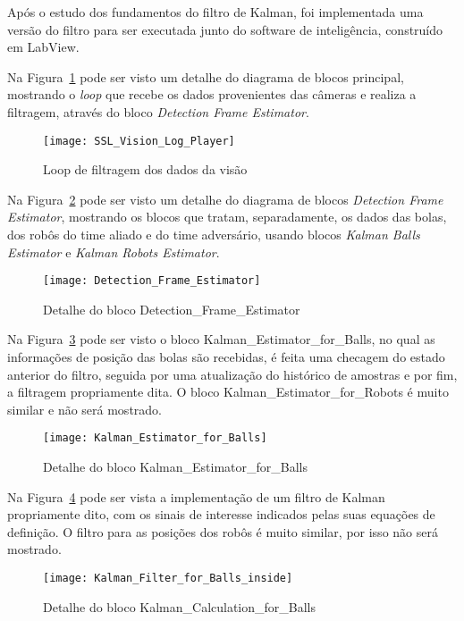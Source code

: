 Após o estudo dos fundamentos do filtro de Kalman, foi implementada uma versão do filtro para ser executada junto do software de inteligência, construído em LabView.

Na Figura~\ref{fig:log_player} pode ser visto um detalhe do diagrama de blocos principal, mostrando o \textit{loop} que recebe os dados provenientes das câmeras e realiza a filtragem, através do bloco \textit{Detection Frame Estimator}.

\begin{figure}
	\centering
	\texttt{[image: SSL\_Vision\_Log\_Player]}
	\caption{Loop de filtragem dos dados da visão}
	\label{fig:log_player}
\end{figure}

Na Figura~\ref{fig:frame_estim} pode ser visto um detalhe do diagrama de blocos \textit{Detection Frame Estimator}, mostrando os blocos que tratam, separadamente, os dados das bolas, dos robôs do time aliado e do time adversário, usando blocos \textit{Kalman Balls Estimator} e \textit{Kalman Robots Estimator}.

\begin{figure}
	\centering
	\texttt{[image: Detection\_Frame\_Estimator]}
	\caption{Detalhe do bloco Detection_Frame_Estimator}
	\label{fig:frame_estim}
\end{figure}

Na Figura~\ref{fig:kalman_balls} pode ser visto o bloco Kalman_Estimator_for_Balls, no qual as informações de posição das bolas são recebidas, é feita uma checagem do estado anterior do filtro, seguida por uma atualização do histórico de amostras e por fim, a filtragem propriamente dita. O bloco Kalman_Estimator_for_Robots é muito similar e não será mostrado. 

\begin{figure}
	\centering
	\texttt{[image: Kalman\_Estimator\_for\_Balls]}
	\caption{Detalhe do bloco Kalman_Estimator_for_Balls}
	\label{fig:kalman_balls}
\end{figure}


Na Figura~\ref{fig:kalman_balls_inside} pode ser vista a implementação de um filtro de Kalman propriamente dito, com os sinais de interesse indicados pelas suas equações de definição. O filtro para as posições dos robôs é muito similar, por isso não será mostrado.

\begin{figure}
	\centering
	\texttt{[image: Kalman\_Filter\_for\_Balls\_inside]}
	\caption{Detalhe do bloco Kalman_Calculation_for_Balls}
	\label{fig:kalman_balls_inside}
\end{figure}



